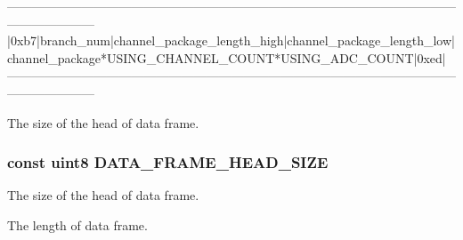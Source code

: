 \begin{DoxyVerb}---------------------------------------------------------------------------------------------------------------------------------
|0xb7|branch_num|channel_package_length_high|channel_package_length_low|channel_package*USING_CHANNEL_COUNT*USING_ADC_COUNT|0xed|
---------------------------------------------------------------------------------------------------------------------------------
\end{DoxyVerb}
The size of the head of data frame. \hypertarget{group___a_r_m_const_ga44f6170bf5a312cd050f5a8dbcf3d4de}{
\subsubsection[{D\-A\-T\-A\-\_\-\-F\-R\-A\-M\-E\-\_\-\-H\-E\-A\-D\-\_\-\-S\-I\-Z\-E}]{\setlength{\rightskip}{0pt plus 5cm}const uint8 D\-A\-T\-A\-\_\-\-F\-R\-A\-M\-E\-\_\-\-H\-E\-A\-D\-\_\-\-S\-I\-Z\-E}}\label{group___a_r_m_const_ga44f6170bf5a312cd050f5a8dbcf3d4de}
The size of the head of data frame.

The length of data frame.

